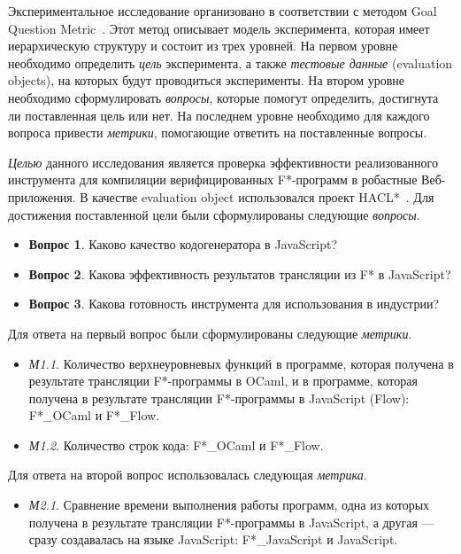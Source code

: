 Экспериментальное исследование организовано в соответствии с методом Goal Question Metric~\cite{van2002goal}. Этот метод описывает модель эксперимента, которая имеет иерархическую структуру и состоит из трех уровней. На первом уровне необходимо определить \textit{цель} эксперимента, а также \textit{тестовые данные} (evaluation objects), на которых будут проводиться эксперименты. На втором уровне необходимо сформулировать \textit{вопросы}, которые помогут определить, достигнута ли поставленная цель или нет. На последнем уровне необходимо для каждого вопроса привести \textit{метрики}, помогающие ответить на поставленные вопросы. 

\textit{Целью} данного исследования является проверка эффективности реализованного инструмента для компиляции верифицированных F*-программ в робастные Веб-приложения. В качестве evaluation object использовался проект HACL*~\cite{hacl_star}. Для достижения поставленной цели были сформулированы следующие \textit{вопросы}.

\begin{itemize}
\item[] \textbf{Вопрос 1}. Каково качество кодогенератора в JavaScript?
\item[] \textbf{Вопрос 2}. Какова эффективность результатов трансляции из F* в JavaScript?
\item[] \textbf{Вопрос 3}. Какова готовность инструмента для использования в индустрии?
\end{itemize}

Для ответа на первый вопрос были сформулированы следующие \textit{метрики}.

\begin{itemize}
\item[] \textit{М1.1}. Количество верхнеуровневых функций в программе, которая получена в результате трансляции F*-программы в OCaml, и в программе, которая получена в результате трансляции F*-программы в JavaScript (Flow): F*\_OCaml и F*\_Flow.
\item[] \textit{М1.2}. Количество строк кода: F*\_OCaml и F*\_Flow.
\end{itemize}

Для ответа на второй вопрос использовалась следующая \textit{метрика}.

\begin{itemize}
\item[] \textit{М2.1}. Сравнение времени выполнения работы программ, одна из которых получена в результате трансляции F*-программы в JavaScript, а другая --- сразу создавалась на языке JavaScript: F*\_JavaScript и JavaScript.
\end{itemize}

